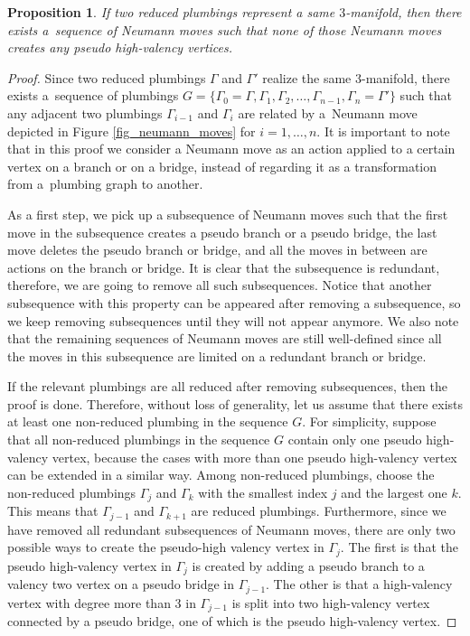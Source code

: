 \documentclass[11pt]{article}
\numberwithin{equation}{section}
\numberwithin{equation}{section}
\newtheorem{Proposition}[Theorem]{Proposition}
\begin{document}
\begin{Proposition}\label{proposition_relation_reduced_plumbings}
If two reduced plumbings represent a same $3$-manifold, then there exists a~sequence of Neumann moves such that none of those Neumann moves creates any pseudo high-valency vertices.
\end{Proposition}
\begin{proof}
Since two reduced plumbings $\Gamma$ and $\Gamma'$ realize the same 3-manifold, there exists a~sequence of plumbings $G=\{\Gamma_0=\Gamma, \Gamma_1, \Gamma_2, \dots, \Gamma_{n-1}, \Gamma_n=\Gamma'\}$ such that any adjacent two plumbings $\Gamma_{i-1}$ and $\Gamma_i$ are related by a~Neumann move depicted in Figure \ref{fig_neumann_moves} for $i=1, \dots, n$. It is important to note that in this proof we consider a Neumann move as an action applied to a certain vertex on a branch or on a bridge, instead of regarding it as a transformation from a~plumbing graph to another.
	
As a first step, we pick up a subsequence of Neumann moves such that the first move in the subsequence creates a pseudo branch or a pseudo bridge, the last move deletes the pseudo branch or bridge, and all the moves in between are actions on the branch or bridge. It is clear that the subsequence is redundant, therefore, we are going to remove all such subsequences. Notice that another subsequence with this property can be appeared after removing a subsequence, so we keep removing subsequences until they will not appear anymore. We also note that the remaining sequences of Neumann moves are still well-defined since all the moves in this subsequence are limited on a redundant branch or bridge.
	
If the relevant plumbings are all reduced after removing subsequences, then the proof is done. Therefore, without loss of generality, let us assume that there exists at least one non-reduced plumbing in the sequence $G$. For simplicity, suppose that all non-reduced plumbings in the sequence $G$ contain only one pseudo high-valency vertex, because the cases with more than one pseudo high-valency vertex can be extended in a similar way. Among non-reduced plumbings, choose the non-reduced plumbings $\Gamma_j$ and $\Gamma_k$ with the smallest index $j$ and the largest one $k$. This means that $\Gamma_{j-1}$ and $\Gamma_{k+1}$ are reduced plumbings. Furthermore, since we have removed all redundant subsequences of Neumann moves, there are only two possible ways to create the pseudo-high valency vertex in $\Gamma_j$. The first is that the pseudo high-valency vertex in $\Gamma_j$ is created by adding a pseudo branch to a valency two vertex on a pseudo bridge in $\Gamma_{j-1}$. The other is that a high-valency vertex with degree more than 3 in $\Gamma_{j-1}$ is split into two high-valency vertex connected by a pseudo bridge, one of which is the pseudo high-valency vertex.
	

\end{proof}
\end{document}
